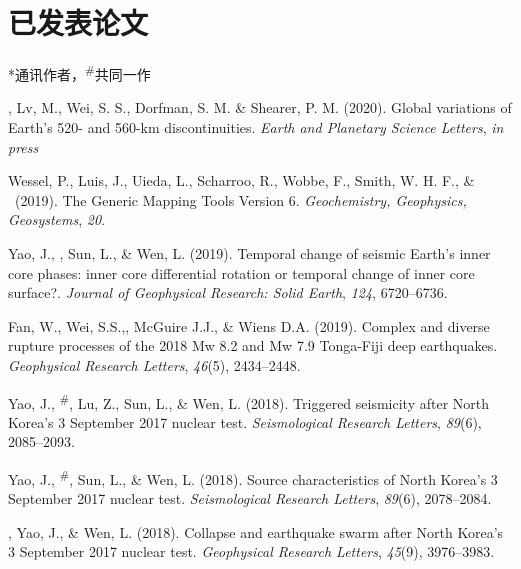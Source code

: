 \newcommand{\Revision}{\textit{正在审稿}}
\newcommand{\CS}{*} %
\newcommand{\CF}{\textsuperscript{\#}} %

\section*{已发表论文}
\CS 通讯作者，\CF 共同一作

\begin{etaremune}
\item \Tian, Lv, M., Wei, S. S., Dorfman, S. M. \& Shearer, P. M. (2020).
	Global variations of Earth's 520- and 560-km discontinuities.
	\textit{Earth and Planetary Science Letters},
	\textit{in press}
\item
    Wessel, P., Luis, J., Uieda, L., Scharroo, R., Wobbe, F., Smith, W. H. F., \& \Tian\ (2019).
    The Generic Mapping Tools Version 6.
    \textit{Geochemistry, Geophysics, Geosystems}, \textit{20}.
\item
    Yao, J., \Tian, Sun, L., \& Wen, L. (2019).
    Temporal change of seismic Earth's inner core phases: inner core differential rotation or temporal change of inner core surface?.
    \textit{Journal of Geophysical Research: Solid Earth}, \textit{124}, 6720--6736.
\item
    Fan, W., Wei, S.S.,\Tian, McGuire J.J., \& Wiens D.A. (2019).
    Complex and diverse rupture processes of the 2018 Mw 8.2 and Mw 7.9 Tonga-Fiji deep earthquakes.
    \textit{Geophysical Research Letters}, \textit{46}(5), 2434--2448.
\item
    Yao, J., \Tian\CF, Lu, Z., Sun, L., \& Wen, L. (2018).
    Triggered seismicity after North Korea's 3 September 2017 nuclear test.
    \textit{Seismological Research Letters}, \textit{89}(6), 2085--2093.
\item
    Yao, J., \Tian\CF, Sun, L., \& Wen, L. (2018).
	Source characteristics of North Korea's 3 September 2017 nuclear test.
    \textit{Seismological Research Letters}, \textit{89}(6), 2078--2084.
\item
    \Tian, Yao, J., \& Wen, L. (2018).
    Collapse and earthquake swarm after North Korea's 3 September 2017 nuclear test.
    \textit{Geophysical Research Letters}, \textit{45}(9), 3976--3983.
\item

\end{etaremune}
